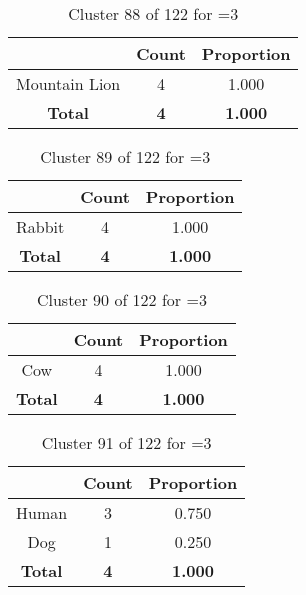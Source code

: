 \begin{table}[ht!]
\centering
\begin{tabular}{|c|c|c|}
\hline
\bf \Spec{} &\bf Count &\bf Proportion\\ \hline \hline
Mountain Lion & 4 & 1.000\\ \hline
\hline
\bf Total & \bf 4 & \bf 1.000\\ \hline
\end{tabular}
\label{tab:cluster:88:3}
\caption{Cluster 88 of 122 for \minneigh{}=3}
\end{table}

\begin{table}[ht!]
\centering
\begin{tabular}{|c|c|c|}
\hline
\bf \Spec{} &\bf Count &\bf Proportion\\ \hline \hline
Rabbit & 4 & 1.000\\ \hline
\hline
\bf Total & \bf 4 & \bf 1.000\\ \hline
\end{tabular}
\label{tab:cluster:89:3}
\caption{Cluster 89 of 122 for \minneigh{}=3}
\end{table}

\clearpage
\begin{table}[ht!]
\centering
\begin{tabular}{|c|c|c|}
\hline
\bf \Spec{} &\bf Count &\bf Proportion\\ \hline \hline
Cow & 4 & 1.000\\ \hline
\hline
\bf Total & \bf 4 & \bf 1.000\\ \hline
\end{tabular}
\label{tab:cluster:90:3}
\caption{Cluster 90 of 122 for \minneigh{}=3}
\end{table}

\begin{table}[ht!]
\centering
\begin{tabular}{|c|c|c|}
\hline
\bf \Spec{} &\bf Count &\bf Proportion\\ \hline \hline
Human & 3 & 0.750\\ \hline
Dog & 1 & 0.250\\ \hline
\hline
\bf Total & \bf 4 & \bf 1.000\\ \hline
\end{tabular}
\label{tab:cluster:91:3}
\caption{Cluster 91 of 122 for \minneigh{}=3}
\end{table}

